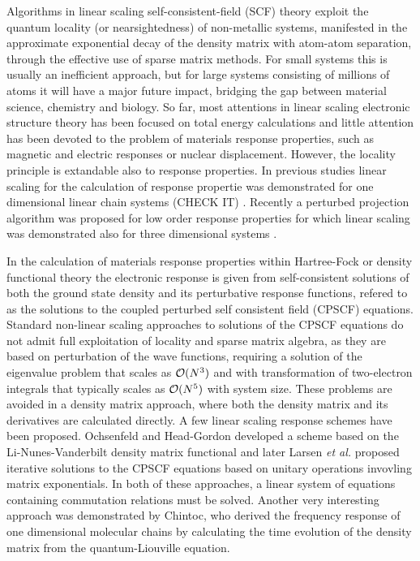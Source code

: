\documentclass[twocolumn,showpacs,preprintnumbers,amsmath,amssymb]{revtex4}
\begin{document}
 Algorithms in linear scaling self-consistent-field (SCF) theory 
 exploit the quantum locality (or nearsightedness) of non-metallic systems, 
 manifested in the approximate exponential decay of the density matrix 
 with atom-atom separation, through the effective use of sparse 
 matrix methods. For small systems this is usually an inefficient
 approach, but for large systems consisting of millions
 of atoms it will have a major future impact, bridging the gap
 between material science, chemistry and biology. So far, most 
 attentions in linear scaling electronic structure
 theory has been focused on total energy calculations and little
 attention has been devoted to the problem of materials response
 properties, such as magnetic and electric responses or nuclear
 displacement. However, the locality principle is extandable
 also to response properties. In previous studies linear scaling 
 for the calculation of response propertie was demonstrated for one
 dimensional linear chain systems (CHECK IT)
 \cite{Ochsenfeld_1997,Ochsenfeld_1998,chintoc}. Recently
 a perturbed projection algorithm was proposed for low order
 response properties for which linear scaling was demonstrated
 also for three dimensional systems \cite{Weber_Niklasson_Challacombe_2004}.

 In the calculation of materials response properties within 
 Hartree-Fock or density functional theory the electronic
 response is given from self-consistent solutions of both
 the ground state density and its perturbative response functions,
 refered to as the solutions to the coupled perturbed self consistent 
 field (CPSCF) equations.
 Standard non-linear scaling approaches to solutions of the CPSCF equations 
 \cite{Pople_1979,Sekino_1986,Dupuis_1991} do not admit full exploitation 
 of locality and sparse matrix algebra, as they are based on perturbation 
 of the wave functions, requiring a solution of the eigenvalue problem
 that scales as ${\cal O}(N^3)$ and with transformation of two-electron
 integrals that typically scales as ${\cal O}(N^5)$ with system size.
 These problems are avoided in a density matrix approach, where both
 the density matrix and its derivatives are calculated directly.
 A few linear scaling response schemes have been proposed.
 Ochsenfeld and Head-Gordon developed a scheme based on the
 Li-Nunes-Vanderbilt density matrix functional \cite{Ochsenfeld_1997}
 and later Larsen {\em et al.} \cite{Helgaker_2001} proposed iterative 
 solutions to the CPSCF equations based on unitary operations
 invovling matrix exponentials. In both of these approaches, a linear 
 system of equations containing commutation relations must be solved.
 Another very interesting approach was demonstrated by Chintoc, who
 derived the frequency response of one dimensional molecular chains
 by calculating the time evolution of the density matrix from
 the quantum-Liouville equation.
\end{document}
